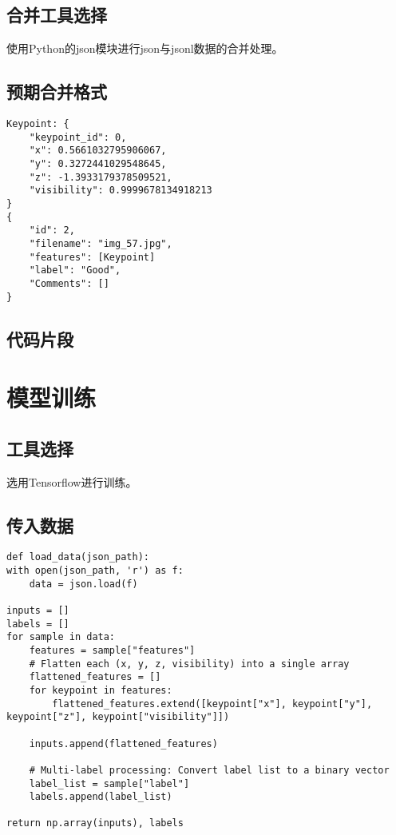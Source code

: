 \subsection{合并工具选择}

使用Python的json模块进行json与jsonl数据的合并处理。

\subsection{预期合并格式}
\begin{lstlisting}
Keypoint: {
    "keypoint_id": 0,
    "x": 0.5661032795906067,
    "y": 0.3272441029548645,
    "z": -1.3933179378509521,
    "visibility": 0.9999678134918213
}
{
    "id": 2,
    "filename": "img_57.jpg",
    "features": [Keypoint]
    "label": "Good",
    "Comments": []
}
\end{lstlisting}

\subsection{代码片段}

\section{模型训练}

\subsection{工具选择}

选用Tensorflow进行训练。

\subsection{传入数据}

\begin{lstlisting}
def load_data(json_path):
with open(json_path, 'r') as f:
    data = json.load(f)

inputs = []
labels = []
for sample in data:
    features = sample["features"]
    # Flatten each (x, y, z, visibility) into a single array
    flattened_features = []
    for keypoint in features:
        flattened_features.extend([keypoint["x"], keypoint["y"], keypoint["z"], keypoint["visibility"]])

    inputs.append(flattened_features)

    # Multi-label processing: Convert label list to a binary vector
    label_list = sample["label"]
    labels.append(label_list)

return np.array(inputs), labels
\end{lstlisting}

